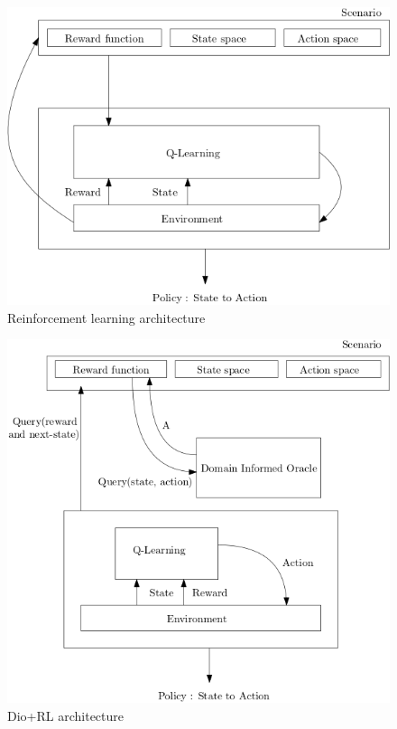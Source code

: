 \documentclass[a4paper,11pt]{article}
\begin{document}
\medskip 

\begin{figure}[H]
  \centering
  \includegraphics[scale=0.41]{basicrl.png}
  \caption{Reinforcement learning architecture}
  \label{fig:basicrl}
\end{figure}


\begin{figure}[H]
  \centering
  \includegraphics[scale=0.42]{dio.png}
  \caption{Dio+RL architecture}
  \label{fig:diorl}
\end{figure}
\end{document}

